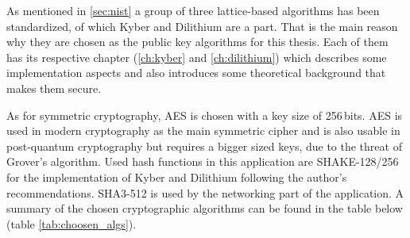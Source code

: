 As mentioned in \ref{sec:nist} a group of three lattice-based algorithms has been standardized, of which Kyber and Dilithium are a part. That is the main reason why they are chosen as the public key algorithms for this thesis. Each of them has its respective chapter (\ref{ch:kyber} and \ref{ch:dilithium}) which describes some implementation aspects and also introduces some theoretical background that makes them secure.

As for symmetric cryptography, AES is chosen with a key size of 256\,bits. AES is used in modern cryptography as the main symmetric cipher and is also usable in post-quantum cryptography but requires a bigger sized keys, due to the threat of Grover's algorithm. Used hash functions in this application are SHAKE-128/256 for the implementation of Kyber and Dilithium following the author's recommendations. SHA3-512 is used by the networking part of the application. A summary of the chosen cryptographic algorithms can be found in the table below (table \ref{tab:choosen_algs}).
